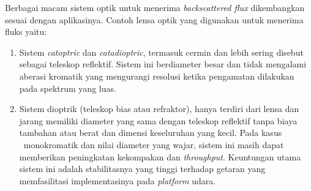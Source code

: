 Berbagai macam sistem optik untuk menerima \textit{backscattered flux} dikembangkan sesuai dengan aplikasinya. Contoh lensa optik yang digunakan untuk menerima fluks yaitu:
\begin{enumerate}
    \item  Sistem \textit{catoptric} dan \textit{catadioptric}, termasuk cermin dan lebih sering disebut sebagai teleskop reflektif. Sistem ini berdiameter besar dan tidak mengalami aberasi kromatik yang mengurangi resolusi ketika pengamatan dilakukan pada spektrum yang luas. 
    \item Sistem dioptrik (teleskop bias atau refraktor), hanya terdiri dari lensa dan jarang memiliki diameter yang sama dengan teleskop reflektif tanpa biaya tambahan atau berat dan dimensi keseluruhan yang kecil. Pada kasus \lidar\ monokromatik dan nilai diameter yang wajar, sistem ini masih dapat memberikan peningkatan kekompakan dan \textit{throughput}. Keuntungan utama sistem ini adalah stabilitasnya yang tinggi terhadap getaran yang memfasilitasi implementasinya pada \textit{platform} udara.
\end{enumerate}

